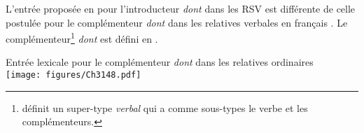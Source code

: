 
\z

L’entrée proposée en  pour l’introducteur \textit{dont} dans les RSV est différente de celle postulée pour le complémenteur \textit{dont} dans les relatives verbales en français \citep{Godard1988,Godard1989,AbeilleEtAl2003c,AbeilleEtAl2006,AbeilleEtAl2007}. Le complémenteur\footnote{ \citet{Sag1997} définit un super-type \textit{verbal} qui a comme sous-types le verbe et les complémenteurs.} \textit{dont} est défini en .

\ea \label{ch3:ex148}
Entrée lexicale pour le complémenteur \textit{dont} dans les relatives ordinaires\\
\texttt{[image: figures/Ch3148.pdf]}


\z


